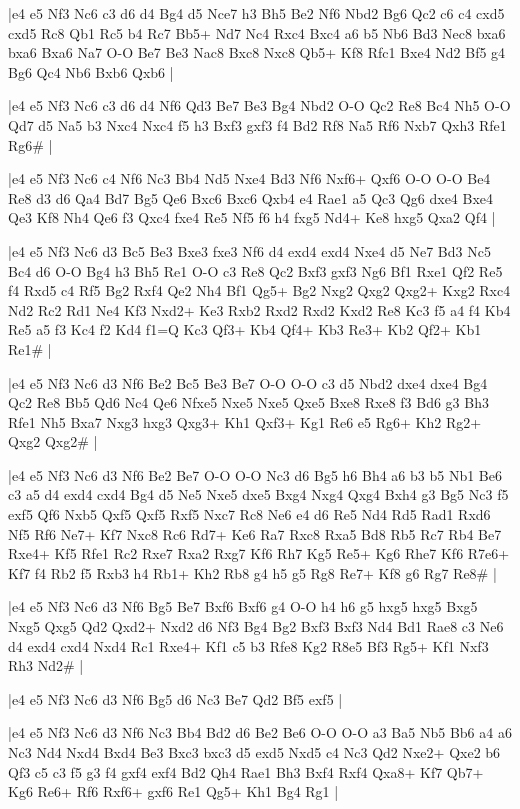 \whitename{}
\blackname{}
\makegametitle
|e4 e5 Nf3 Nc6 c3 d6 d4 Bg4 d5 Nce7 h3 Bh5 Be2 Nf6 Nbd2 Bg6 Qc2 c6 c4 cxd5 cxd5 Rc8 Qb1 Rc5 b4 Rc7 Bb5+ Nd7 Nc4 Rxc4 Bxc4 a6 b5 Nb6 Bd3 Nec8 bxa6 bxa6 Bxa6 Na7 O-O Be7 Be3 Nac8 Bxc8 Nxc8 Qb5+ Kf8 Rfc1 Bxe4 Nd2 Bf5 g4 Bg6 Qc4 Nb6 Bxb6 Qxb6  |

\whitename{}
\blackname{}
\makegametitle
|e4 e5 Nf3 Nc6 c3 d6 d4 Nf6 Qd3 Be7 Be3 Bg4 Nbd2 O-O Qc2 Re8 Bc4 Nh5 O-O Qd7 d5 Na5 b3 Nxc4 Nxc4 f5 h3 Bxf3 gxf3 f4 Bd2 Rf8 Na5 Rf6 Nxb7 Qxh3 Rfe1 Rg6\#  |

\whitename{}
\blackname{}
\makegametitle
|e4 e5 Nf3 Nc6 c4 Nf6 Nc3 Bb4 Nd5 Nxe4 Bd3 Nf6 Nxf6+ Qxf6 O-O O-O Be4 Re8 d3 d6 Qa4 Bd7 Bg5 Qe6 Bxc6 Bxc6 Qxb4 e4 Rae1 a5 Qc3 Qg6 dxe4 Bxe4 Qe3 Kf8 Nh4 Qe6 f3 Qxc4 fxe4 Re5 Nf5 f6 h4 fxg5 Nd4+ Ke8 hxg5 Qxa2 Qf4  |

\whitename{}
\blackname{}
\makegametitle
|e4 e5 Nf3 Nc6 d3 Bc5 Be3 Bxe3 fxe3 Nf6 d4 exd4 exd4 Nxe4 d5 Ne7 Bd3 Nc5 Bc4 d6 O-O Bg4 h3 Bh5 Re1 O-O c3 Re8 Qc2 Bxf3 gxf3 Ng6 Bf1 Rxe1 Qf2 Re5 f4 Rxd5 c4 Rf5 Bg2 Rxf4 Qe2 Nh4 Bf1 Qg5+ Bg2 Nxg2 Qxg2 Qxg2+ Kxg2 Rxc4 Nd2 Rc2 Rd1 Ne4 Kf3 Nxd2+ Ke3 Rxb2 Rxd2 Rxd2 Kxd2 Re8 Kc3 f5 a4 f4 Kb4 Re5 a5 f3 Kc4 f2 Kd4 f1=Q Kc3 Qf3+ Kb4 Qf4+ Kb3 Re3+ Kb2 Qf2+ Kb1 Re1\#  |

\whitename{}
\blackname{}
\makegametitle
|e4 e5 Nf3 Nc6 d3 Nf6 Be2 Bc5 Be3 Be7 O-O O-O c3 d5 Nbd2 dxe4 dxe4 Bg4 Qc2 Re8 Bb5 Qd6 Nc4 Qe6 Nfxe5 Nxe5 Nxe5 Qxe5 Bxe8 Rxe8 f3 Bd6 g3 Bh3 Rfe1 Nh5 Bxa7 Nxg3 hxg3 Qxg3+ Kh1 Qxf3+ Kg1 Re6 e5 Rg6+ Kh2 Rg2+ Qxg2 Qxg2\#  |

\whitename{}
\blackname{}
\makegametitle
|e4 e5 Nf3 Nc6 d3 Nf6 Be2 Be7 O-O O-O Nc3 d6 Bg5 h6 Bh4 a6 b3 b5 Nb1 Be6 c3 a5 d4 exd4 cxd4 Bg4 d5 Ne5 Nxe5 dxe5 Bxg4 Nxg4 Qxg4 Bxh4 g3 Bg5 Nc3 f5 exf5 Qf6 Nxb5 Qxf5 Qxf5 Rxf5 Nxc7 Rc8 Ne6 e4 d6 Re5 Nd4 Rd5 Rad1 Rxd6 Nf5 Rf6 Ne7+ Kf7 Nxc8 Rc6 Rd7+ Ke6 Ra7 Rxc8 Rxa5 Bd8 Rb5 Rc7 Rb4 Be7 Rxe4+ Kf5 Rfe1 Rc2 Rxe7 Rxa2 Rxg7 Kf6 Rh7 Kg5 Re5+ Kg6 Rhe7 Kf6 R7e6+ Kf7 f4 Rb2 f5 Rxb3 h4 Rb1+ Kh2 Rb8 g4 h5 g5 Rg8 Re7+ Kf8 g6 Rg7 Re8\#  |

\whitename{}
\blackname{}
\makegametitle
|e4 e5 Nf3 Nc6 d3 Nf6 Bg5 Be7 Bxf6 Bxf6 g4 O-O h4 h6 g5 hxg5 hxg5 Bxg5 Nxg5 Qxg5 Qd2 Qxd2+ Nxd2 d6 Nf3 Bg4 Bg2 Bxf3 Bxf3 Nd4 Bd1 Rae8 c3 Ne6 d4 exd4 cxd4 Nxd4 Rc1 Rxe4+ Kf1 c5 b3 Rfe8 Kg2 R8e5 Bf3 Rg5+ Kf1 Nxf3 Rh3 Nd2\#  |

\whitename{}
\blackname{}
\makegametitle
|e4 e5 Nf3 Nc6 d3 Nf6 Bg5 d6 Nc3 Be7 Qd2 Bf5 exf5  |

\whitename{}
\blackname{}
\makegametitle
|e4 e5 Nf3 Nc6 d3 Nf6 Nc3 Bb4 Bd2 d6 Be2 Be6 O-O O-O a3 Ba5 Nb5 Bb6 a4 a6 Nc3 Nd4 Nxd4 Bxd4 Be3 Bxc3 bxc3 d5 exd5 Nxd5 c4 Nc3 Qd2 Nxe2+ Qxe2 b6 Qf3 c5 c3 f5 g3 f4 gxf4 exf4 Bd2 Qh4 Rae1 Bh3 Bxf4 Rxf4 Qxa8+ Kf7 Qb7+ Kg6 Re6+ Rf6 Rxf6+ gxf6 Re1 Qg5+ Kh1 Bg4 Rg1  |

